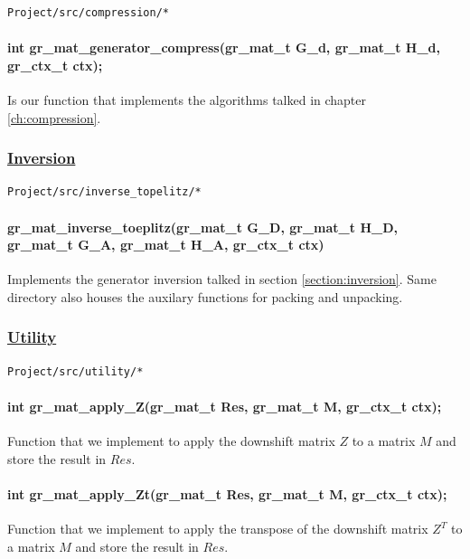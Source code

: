 \begin{verbatim}
Project/src/compression/*
\end{verbatim}

\paragraph{int gr\_mat\_generator\_compress(gr\_mat\_t G\_d,
gr\_mat\_t H\_d, gr\_ctx\_t ctx);} Is our function that implements
the algorithms talked in chapter \ref{ch:compression}.

\subsubsection*{\underline{Inversion}}
\begin{verbatim}
Project/src/inverse_topelitz/*
\end{verbatim}

\paragraph{gr\_mat\_inverse\_toeplitz(gr\_mat\_t G\_D, gr\_mat\_t
H\_D, gr\_mat\_t G\_A, gr\_mat\_t H\_A, gr\_ctx\_t ctx)} Implements
the generator inversion talked in section \ref{section:inversion}.
Same directory also houses the auxilary functions for packing and unpacking.

\subsubsection*{\underline{Utility}}\label{annexe:utility}
\begin{verbatim}
Project/src/utility/*
\end{verbatim}

\paragraph{int gr\_mat\_apply\_Z(gr\_mat\_t Res, gr\_mat\_t M, gr\_ctx\_t ctx);}
Function that we implement to apply the downshift matrix $Z$ to a
matrix $M$ and store the result in $Res$.
\paragraph{int gr\_mat\_apply\_Zt(gr\_mat\_t Res, gr\_mat\_t M,
gr\_ctx\_t ctx);}
Function that we implement to apply the transpose of the downshift
matrix $Z^T$ to a matrix $M$ and store the result in $Res$.
